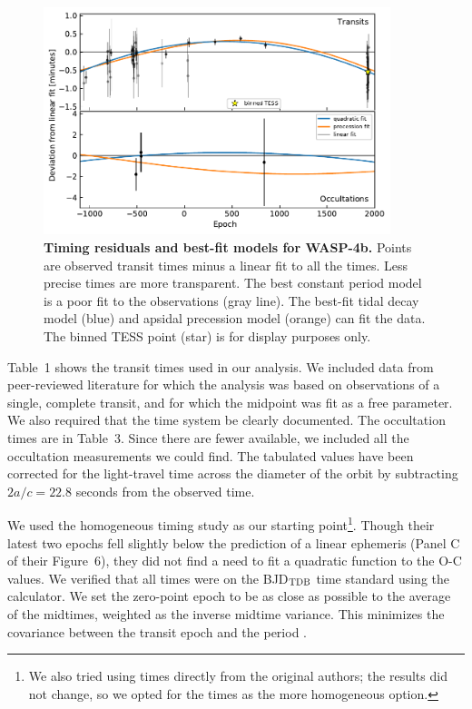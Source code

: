 \documentclass[12pt,twocolumn,tighten]{aastex62}
\begin{document}
\begin{figure}[t]
    \begin{center}
        \leavevmode
        \includegraphics[width=0.9\textwidth]{f3.pdf}
    \end{center}
    \vspace{-0.5cm}
    \caption{
        {\bf Timing residuals and best-fit models for WASP-4b.}
        Points are observed transit times minus a
        linear fit to all the times.
        Less precise times are more transparent.
        The best constant period
        model is a poor fit to the observations (gray line).
        The best-fit tidal decay model (blue) and apsidal precession
        model (orange) can fit the data.
        The binned TESS point (star)
        is for display purposes only.
        \label{fig:times}
    }
\end{figure}

Table~1 shows the transit times used in our analysis.  We included
data from peer-reviewed literature for which the analysis was based on
observations of a single, complete transit, and for which the midpoint
was fit as a free parameter. We also required that the time system be
clearly documented.  The occultation times are in Table~3.  Since
there are fewer available, we included all the occultation
measurements we could find. The tabulated values have been corrected
for the light-travel time across the diameter of the orbit by
subtracting $2a/c = 22.8$ seconds from the observed time.

We used the homogeneous \citet{hoyer_tramos_2013} timing study as our
starting point\footnote{We also tried using times directly from the
original authors; the results did not change, so we opted for the
\citet{hoyer_tramos_2013} times as the more homogeneous option.}.
Though their latest two epochs fell slightly below the prediction of a
linear ephemeris (Panel C of their Figure~6), they did not find a need
to fit a quadratic function to the O-C values.  We verified that all
times were on the BJD$_{\rm TDB}$ time standard using the
\citet{eastman_achieving_2010} calculator.  We set the zero-point
epoch to be as close as possible to the average of the midtimes,
weighted as the inverse midtime variance. This minimizes the
covariance between the transit epoch and the period
\citep{gibson_gemini_2013}.
\end{document}
